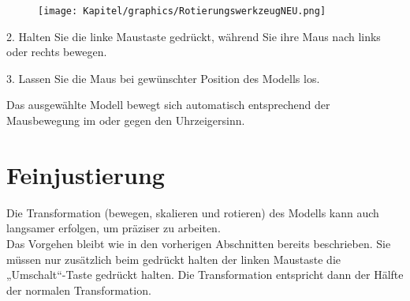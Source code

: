 \begin{figure}[th]
    \centering
    \texttt{[image: Kapitel/graphics/RotierungswerkzeugNEU.png]}
    \label{fig:enter-label}
\end{figure}

2. Halten Sie die linke Maustaste gedrückt, während Sie ihre Maus nach links oder rechts bewegen.

3. Lassen Sie die Maus bei gewünschter Position des Modells los.

Das ausgewählte Modell bewegt sich automatisch entsprechend der Mausbewegung im oder gegen den Uhrzeigersinn.

\section{Feinjustierung}
Die Transformation (bewegen, skalieren und rotieren) des Modells kann auch langsamer erfolgen, um präziser zu arbeiten.\\
Das Vorgehen bleibt wie in den vorherigen Abschnitten bereits beschrieben. Sie müssen nur zusätzlich beim gedrückt halten der linken Maustaste die „Umschalt“-Taste gedrückt halten. Die Transformation entspricht dann der Hälfte der normalen Transformation.
